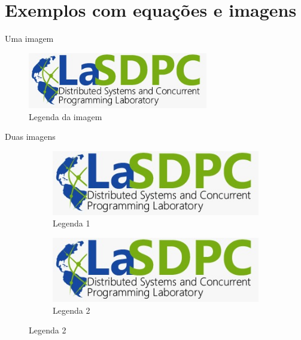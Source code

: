 \section{Exemplos com equações e imagens} %


\begin{frame}{Uma imagem}
   \begin{figure}[h]
       \centering
       \includegraphics[width=0.7\textwidth]{images/lab_logo.jpeg}
       \caption{Legenda da imagem}
       \label{fig:label_da_imagem}
   \end{figure}
\end{frame}


\begin{frame}{Duas imagens}
   \begin{figure}
       \centering
       \begin{subfigure}[b]{0.45\textwidth}
           \centering
           \includegraphics[width=\textwidth]{images/lab_logo.jpeg}
           \caption{Legenda 1}
           \label{fig:img1}
       \end{subfigure}
       \hfill
       \begin{subfigure}[b]{0.45\textwidth}
           \centering
           \includegraphics[width=\textwidth]{images/lab_logo.jpeg}
           \caption{Legenda 2}
           \label{fig:img2}
       \end{subfigure}
   \end{figure}
\end{frame}

